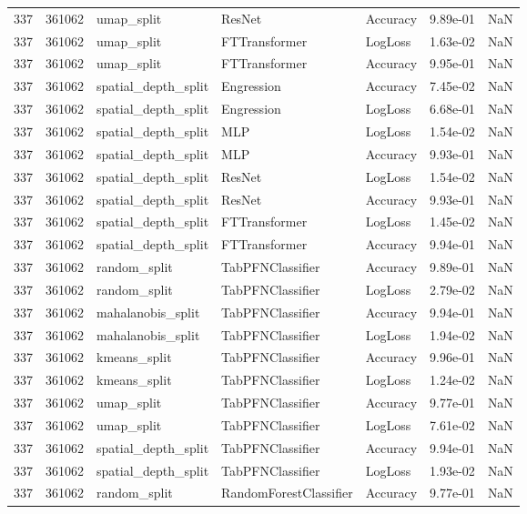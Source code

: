 \begin{tabular}{rrlllrr}
337 & 361062 & umap\_split & ResNet & Accuracy & 9.89e-01 & NaN \\
337 & 361062 & umap\_split & FTTransformer & LogLoss & 1.63e-02 & NaN \\
337 & 361062 & umap\_split & FTTransformer & Accuracy & 9.95e-01 & NaN \\
337 & 361062 & spatial\_depth\_split & Engression & Accuracy & 7.45e-02 & NaN \\
337 & 361062 & spatial\_depth\_split & Engression & LogLoss & 6.68e-01 & NaN \\
337 & 361062 & spatial\_depth\_split & MLP & LogLoss & 1.54e-02 & NaN \\
337 & 361062 & spatial\_depth\_split & MLP & Accuracy & 9.93e-01 & NaN \\
337 & 361062 & spatial\_depth\_split & ResNet & LogLoss & 1.54e-02 & NaN \\
337 & 361062 & spatial\_depth\_split & ResNet & Accuracy & 9.93e-01 & NaN \\
337 & 361062 & spatial\_depth\_split & FTTransformer & LogLoss & 1.45e-02 & NaN \\
337 & 361062 & spatial\_depth\_split & FTTransformer & Accuracy & 9.94e-01 & NaN \\
337 & 361062 & random\_split & TabPFNClassifier & Accuracy & 9.89e-01 & NaN \\
337 & 361062 & random\_split & TabPFNClassifier & LogLoss & 2.79e-02 & NaN \\
337 & 361062 & mahalanobis\_split & TabPFNClassifier & Accuracy & 9.94e-01 & NaN \\
337 & 361062 & mahalanobis\_split & TabPFNClassifier & LogLoss & 1.94e-02 & NaN \\
337 & 361062 & kmeans\_split & TabPFNClassifier & Accuracy & 9.96e-01 & NaN \\
337 & 361062 & kmeans\_split & TabPFNClassifier & LogLoss & 1.24e-02 & NaN \\
337 & 361062 & umap\_split & TabPFNClassifier & Accuracy & 9.77e-01 & NaN \\
337 & 361062 & umap\_split & TabPFNClassifier & LogLoss & 7.61e-02 & NaN \\
337 & 361062 & spatial\_depth\_split & TabPFNClassifier & Accuracy & 9.94e-01 & NaN \\
337 & 361062 & spatial\_depth\_split & TabPFNClassifier & LogLoss & 1.93e-02 & NaN \\
337 & 361062 & random\_split & RandomForestClassifier & Accuracy & 9.77e-01 & NaN \\

\end{tabular}
